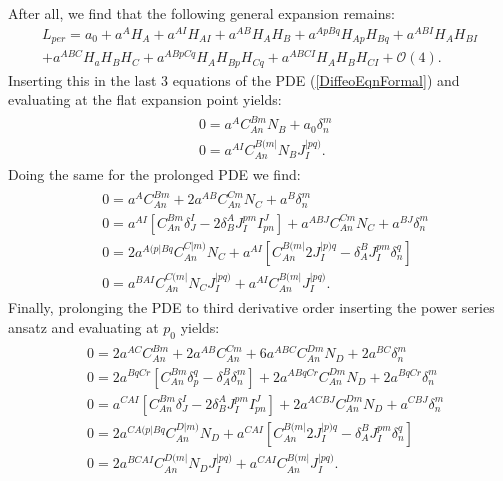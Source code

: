 After all, we find that the following general expansion remains: 
\begin{multline}\label{LperRed}
     L_{per} = a_0 + a^A H_A + a^{AI}H_{AI} + a^{AB} H_{A}H_{B} + a^{ApBq} H_{Ap}H_{Bq} + a^{ABI} H_{A} H_{BI} \\
    + a^{ABC} H_a H_B H_C + a^{ABpCq} H_{A}H_{Bp}H_{Cq}
    + a^{ABCI} H_A H_B H_{CI} 
    + \mathcal{O}(4).
\end{multline}
Inserting this in the last 3 equations of the PDE (\ref{DiffeoEqnFormal}) and evaluating at the flat expansion point yields:
\begin{align}\label{order1}
    \begin{aligned}
    &0 = a^A C_{An}^{Bm}N_B + a_0 \delta^m_n\\
    &0 = a^{AI}C_{An}^{B(m\vert }N_B J^{\vert pq)}_I.
    \end{aligned}
\end{align}
Doing the same for the prolonged PDE we find: 
\begin{align}\label{order2}
    \begin{aligned}
    &0 = a^A C_{An}^{Bm} + 2 a^{AB}C_{An}^{Cm}N_C + a^B\delta^m_n\\
    &0 = a^{AI}\left [C_{An}^{Bm}\delta^I _J- 2 \delta^A_B J_I^{pm}I^J_{pn} \right ] + a^{ABJ}C_{An}^{Cm}N_C + a^{BJ} \delta^m_n \\
    &0 = 2a^{A(p\vert Bq}C_{An}^{C\vert m)}N_C + a^{AI} \left [C_{An}^{B(m\vert} 2 J_{I}^{\vert p)q} - \delta_A^BJ_I^{pm}\delta^q_n \right ]\\
    &0 = a^{BAI}C_{An}^{C(m\vert}N_CJ_I^{\vert pq)} + a^{AI}C_{An}^{B(m \vert} J_I^{\vert pq)}.
    \end{aligned}
\end{align}
Finally, prolonging the PDE to third derivative order inserting the power series ansatz and evaluating at $p_0$ yields:
\begin{align}\label{order3}
\begin{aligned}
&0 = 2 a^{AC}C_{An}^{Bm} + 2a^{AB}C_{An}^{Cm} + 6 a^{ABC}C_{An}^{Dm} N_D + 2a^{BC} \delta^m_n\\
&0 = 2 a^{BqCr} \left [ C_{An}^{Bm} \delta ^q_p - \delta^B_A \delta^m_n \right ] +2 a^{A Bq Cr} C_{An}^{Dm} N_D + 2 a^{BqCr} \delta^m_n\\
&0 = a^{CAI} \left [C_{An}^{Bm}\delta^I _J- 2 \delta^A_B J_I^{pm}I^J_{pn} \right ] + 2 a^{ACBJ} C_{An}^{Dm} N_D + a^{CBJ} \delta ^m _n \\
&0 = 2 a^{C A(p \vert B q} C_{An}^{D \vert m )} N_D + a^{CAI} \left [C_{An}^{B(m\vert} 2 J_{I}^{\vert p)q} - \delta_A^BJ_I^{pm}\delta^q_n \right ]\\
&0 = 2 a^{BCAI}C_{An}^{D(m\vert}N_DJ_I^{\vert pq)} + a^{CAI}C_{An}^{B(m \vert} J_I^{\vert pq)}.
\end{aligned}
\end{align}
